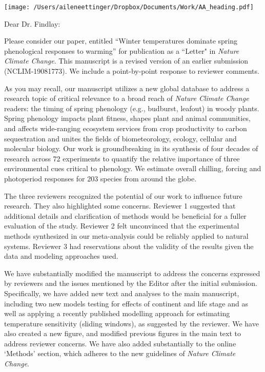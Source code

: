 \documentclass[11.5pt,a4paper]{letter}
\begin{document}
\begin{letter}{}
\texttt{[image: /Users/aileneettinger/Dropbox/Documents/Work/AA\_heading.pdf]}

\opening{Dear Dr. Findlay:}
Please consider our paper, entitled ``Winter temperatures dominate spring phenological responses to warming'' for publication as a ``Letter" in \emph{Nature Climate Change}. This manuscript is a revised version of an earlier submission (NCLIM-19081773). We include a point-by-point response to reviewer comments. 

\par As you may recall, our manuscript utilizes a new global database to address a research topic of critical relevance to a broad reach of \emph{Nature Climate Change} readers:  the timing of spring phenology (e.g., budburst, leafout) in woody plants. Spring phenology impacts plant fitness, shapes plant and animal communities, and affects wide-ranging ecosystem services from crop productivity to carbon sequestration and unites the fields of biometeorology, ecology, cellular and molecular biology. Our work is groundbreaking in its synthesis of four decades of research across 72 experiments
to quantify the relative importance of three environmental cues critical to phenology. We estimate overall chilling, forcing and photoperiod responses for 203 species from around the globe. 

\par The three reviewers recognized the potential of our work to influence future research. They also highlighted some concerns. Reviewer 1 suggested that additional details and clarification of methods would be beneficial for a fuller evaluation of the study.  Reviewer 2 felt unconvinced that the experimental methods synthesized in our meta-analysis could be reliably applied to natural systems. Reviewer 3 had reservations about the validity of the results given the data and modeling approaches used. 

\par We have substantially modified the manuscript to address the concerns expressed by reviewers and the issues mentioned by the Editor after the initial submission. Specifically, we have added new text and analyses to the main manuscript, including two new models testing for effects of continent and life stage and as well as applying a recently published modelling approach for estimating temperature sensitivity (sliding windows), as suggested by the reviewer. We have also created a new figure, and modified previous figures in the main text to address reviewer concerns. We have also added substantially to the online `Methods' section, which adheres to the new guidelines of \emph{Nature Climate Change}.


\end{letter}
\end{document}
